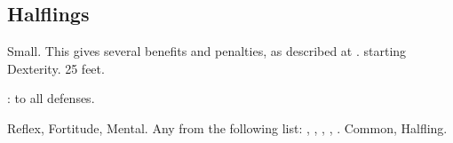\subsection{Halflings}
 Small. This gives several benefits and penalties, as described at .
  starting Dexterity.
 25 feet.
\begin{itemize}
    :  to all defenses.
\end{itemize}
  Reflex,  Fortitude,  Mental.
 Any from the following list: , , , , .
 Common, Halfling.
